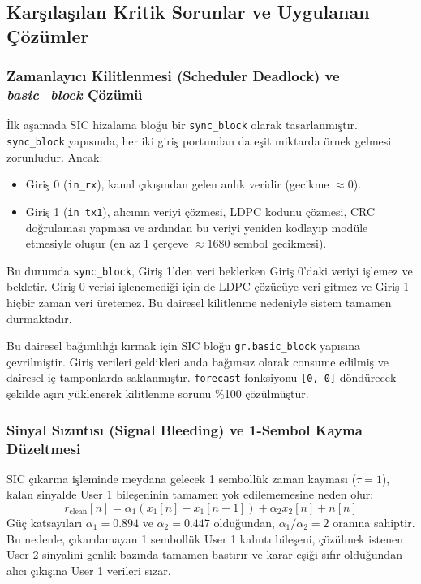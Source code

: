 \subsection{Karşılaşılan Kritik Sorunlar ve Uygulanan Çözümler}

\subsubsection{Zamanlayıcı Kilitlenmesi (Scheduler Deadlock) ve \textit{basic\_block} Çözümü}
İlk aşamada SIC hizalama bloğu bir \texttt{sync\_block} olarak tasarlanmıştır. \texttt{sync\_block} yapısında, her iki giriş portundan da eşit miktarda örnek gelmesi zorunludur. Ancak:
\begin{itemize}
    \item Giriş 0 (\texttt{in\_rx}), kanal çıkışından gelen anlık veridir (gecikme $\approx 0$).
    \item Giriş 1 (\texttt{in\_tx1}), alıcının veriyi çözmesi, LDPC kodunu çözmesi, CRC doğrulaması yapması ve ardından bu veriyi yeniden kodlayıp modüle etmesiyle oluşur (en az 1 çerçeve $\approx 1680$ sembol gecikmesi).
\end{itemize}
Bu durumda \texttt{sync\_block}, Giriş 1'den veri beklerken Giriş 0'daki veriyi işlemez ve bekletir. Giriş 0 verisi işlenemediği için de LDPC çözücüye veri gitmez ve Giriş 1 hiçbir zaman veri üretemez. Bu dairesel kilitlenme nedeniyle sistem tamamen durmaktadır.

Bu dairesel bağımlılığı kırmak için SIC bloğu \texttt{gr.basic\_block} yapısına çevrilmiştir. Giriş verileri geldikleri anda bağımsız olarak consume edilmiş ve dairesel iç tamponlarda saklanmıştır. \texttt{forecast} fonksiyonu \texttt{[0, 0]} döndürecek şekilde aşırı yüklenerek kilitlenme sorunu \%100 çözülmüştür.

\subsubsection{Sinyal Sızıntısı (Signal Bleeding) ve 1-Sembol Kayma Düzeltmesi}
SIC çıkarma işleminde meydana gelecek 1 sembollük zaman kayması ($\tau = 1$), kalan sinyalde User 1 bileşeninin tamamen yok edilememesine neden olur:
\begin{equation}
r_{\text{clean}}[n] = \alpha_1 (x_1[n] - x_1[n-1]) + \alpha_2 x_2[n] + n[n]
\end{equation}
Güç katsayıları $\alpha_1 = 0.894$ ve $\alpha_2 = 0.447$ olduğundan, $\alpha_1 / \alpha_2 = 2$ oranına sahiptir. Bu nedenle, çıkarılamayan 1 sembollük User 1 kalıntı bileşeni, çözülmek istenen User 2 sinyalini genlik bazında tamamen bastırır ve karar eşiği sıfır olduğundan alıcı çıkışına User 1 verileri sızar.

